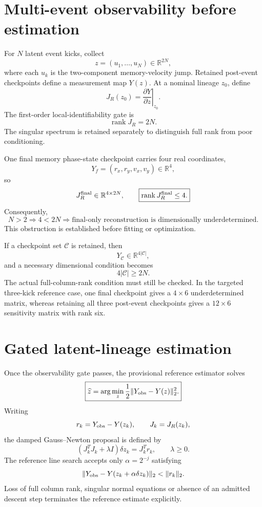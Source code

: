 \documentclass[11pt]{book}
\begin{document}
\section{Multi-event observability before estimation}

For \(N\) latent event kicks, collect
\[
z=(u_1,\ldots,u_N)\in\mathbb R^{2N},
\]
where each \(u_k\) is the two-component memory-velocity jump. Retained post-event checkpoints define a measurement map \(Y(z)\). At a nominal lineage \(z_0\), define
\[
\boxed{
J_R(z_0)=\left.\frac{\partial Y}{\partial z}\right|_{z_0}.
}
\]
The first-order local-identifiability gate is
\[
\boxed{\operatorname{rank}J_R=2N.}
\]
The singular spectrum is retained separately to distinguish full rank from poor conditioning.

One final memory phase-state checkpoint carries four real coordinates,
\[
Y_f=(r_x,r_y,v_x,v_y)\in\mathbb R^4,
\]
so
\[
J_R^{\rm final}\in\mathbb R^{4\times2N},
\qquad
\boxed{\operatorname{rank}J_R^{\rm final}\le4.}
\]
Consequently,
\[
\boxed{
N>2
\Longrightarrow
4<2N
\Longrightarrow
\text{final-only reconstruction is dimensionally underdetermined}.
}
\]
This obstruction is established before fitting or optimization.

If a checkpoint set \(\mathcal C\) is retained, then
\[
Y_{\mathcal C}\in\mathbb R^{4|\mathcal C|},
\]
and a necessary dimensional condition becomes
\[
\boxed{4|\mathcal C|\ge2N.}
\]
The actual full-column-rank condition must still be checked. In the targeted three-kick reference case, one final checkpoint gives a \(4\times6\) underdetermined matrix, whereas retaining all three post-event checkpoints gives a \(12\times6\) sensitivity matrix with rank six.

\section{Gated latent-lineage estimation}

Once the observability gate passes, the provisional reference estimator solves
\[
\boxed{
\widehat z
=\arg\min_z\frac12\|Y_{\rm obs}-Y(z)\|_2^2.
}
\]
Writing
\[
r_k=Y_{\rm obs}-Y(z_k),
\qquad
J_k=J_R(z_k),
\]
the damped Gauss--Newton proposal is defined by
\[
\boxed{
(J_k^T J_k+\lambda I)\delta z_k
=J_k^T r_k,
\qquad \lambda\ge0.
}
\]
The reference line search accepts only \(\alpha=2^{-j}\) satisfying
\[
\|Y_{\rm obs}-Y(z_k+\alpha\delta z_k)\|_2
<\|r_k\|_2.
\]
Loss of full column rank, singular normal equations or absence of an admitted descent step terminates the reference estimate explicitly.
\end{document}
